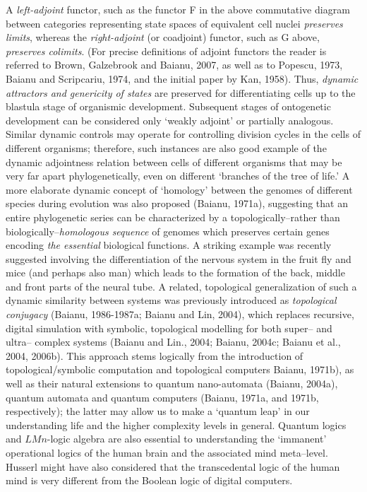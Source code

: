 \documentclass[12pt]{article}
\theoremstyle{plain}
\theoremstyle{definition}
\theoremstyle{plain}
\numberwithin{equation}{section}
\begin{document}
 A \emph{left-adjoint} functor, such as the functor F in the above commutative diagram between categories representing state spaces of equivalent cell nuclei \emph{preserves limits}, whereas the \emph{right-adjoint} (or coadjoint) functor, such as G above, \emph{preserves colimits}. (For precise definitions of adjoint functors the reader is
referred to Brown, Galzebrook and Baianu, 2007, as well as to Popescu, 1973,
Baianu and Scripcariu, 1974, and the initial paper by Kan, 1958).
Thus, {\em dynamic attractors and genericity of states} are preserved for differentiating cells up to the blastula stage of organismic development. Subsequent stages of ontogenetic development can be considered only `weakly adjoint' or partially analogous. Similar dynamic controls may operate for controlling division cycles in the cells of different organisms; therefore, such instances are also good example of the dynamic adjointness relation between cells of different organisms that may be very far apart phylogenetically, even on different `branches of the tree of life.'  A more elaborate dynamic concept of `homology' between the genomes of different
species during evolution was also proposed (Baianu, 1971a), suggesting that an entire phylogenetic series can be characterized by a topologically--rather than biologically--\emph{homologous sequence} of genomes which preserves certain genes encoding \emph{the essential} biological functions. A striking example was recently suggested involving the differentiation of the nervous system in the fruit fly and mice (and perhaps also man) which leads to the formation of the back, middle and front parts of the neural tube. A related, topological generalization of such a dynamic similarity between systems was previously introduced as \emph{topological conjugacy }(Baianu, 1986-1987a; Baianu and Lin, 2004), which replaces recursive, digital simulation with symbolic, topological modelling for both super-- and ultra-- complex systems (Baianu and Lin., 2004; Baianu, 2004c; Baianu et al., 2004, 2006b). This approach stems logically from the introduction of topological/symbolic computation and topological computers Baianu, 1971b), as well as their natural extensions to quantum nano-automata (Baianu, 2004a), quantum automata and quantum computers (Baianu, 1971a, and 1971b, respectively); the latter may allow us to make a `quantum leap' in our understanding life and the higher complexity levels in general. Quantum logics and $LMn$-logic algebra are also essential to understanding the `immanent' operational logics of the human brain and the associated mind meta--level. Husserl might have also considered that the transcedental logic of the human mind is very different from the Boolean logic of digital computers. 
\end{document}
